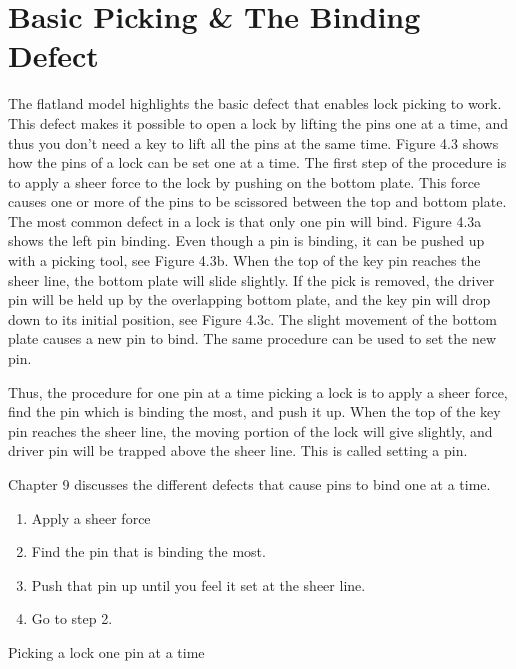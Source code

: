 \chapter{Basic Picking \& The Binding Defect}
The flatland model highlights the basic defect that enables lock picking to work. This defect
makes it possible to open a lock by lifting the pins one at a time, and thus you don't need a
key to lift all the pins at the same time. Figure 4.3 shows how the pins of a lock can be set
one at a time. The first step of the procedure is to apply a sheer force to the lock by pushing
on the bottom plate. This force causes one or more of the pins to be scissored between the
top and bottom plate. The most common defect in a lock is that only one pin will bind.
Figure 4.3a shows the left pin binding. Even though a pin is binding, it can be pushed up
with a picking tool, see Figure 4.3b. When the top of the key pin reaches the sheer line,
the bottom plate will slide slightly. If the pick is removed, the driver pin will be held up
by the overlapping bottom plate, and the key pin will drop down to its initial position, see
Figure 4.3c. The slight movement of the bottom plate causes a new pin to bind. The same
procedure can be used to set the new pin.

Thus, the procedure for one pin at a time picking a lock is to apply a sheer force, find
the pin which is binding the most, and push it up. When the top of the key pin reaches the
sheer line, the moving portion of the lock will give slightly, and driver pin will be trapped
above the sheer line. This is called setting a pin.

Chapter 9 discusses the different defects that cause pins to bind one at a time.

\begin{table}
    \begin{enumerate}
        \item Apply a sheer force
        \item Find the pin that is binding the most.
        \item Push that pin up until you feel it set at the sheer line.
        \item Go to step 2.
    \end{enumerate}
    \caption{Picking a lock one pin at a time}
\end{table}

